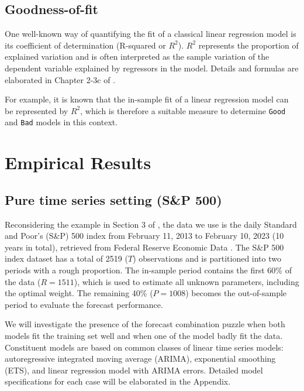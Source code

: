 \documentclass{monashthesis}
\begin{document}
\hypertarget{goodness-of-fit}{%
\section{Goodness-of-fit}\label{goodness-of-fit}}

One well-known way of quantifying the fit of a classical linear regression model is its coefficient of determination (R-squared or \(R^2\)). \(R^2\) represents the proportion of explained variation and is often interpreted as the sample variation of the dependent variable explained by regressors in the model. Details and formulas are elaborated in Chapter 2-3c of \textcite{W15}.

For example, it is known that the in-sample fit of a linear regression model can be represented by \(R^2\), which is therefore a suitable measure to determine \texttt{Good} and \texttt{Bad} models in this context.

\hypertarget{empirical-results}{%
\chapter{Empirical Results}\label{empirical-results}}

\hypertarget{sp500}{%
\section{Pure time series setting (S\&P 500)}\label{sp500}}

Reconsidering the example in Section 3 of \textcite{GA11}, the data we use is the daily Standard and Poor's (S\&P) 500 index from February 11, 2013 to February 10, 2023 (10 years in total), retrieved from Federal Reserve Economic Data \autocite{SP500}. The S\&P 500 index dataset has a total of 2519 (\(T\)) observations and is partitioned into two periods with a rough proportion. The in-sample period contains the first 60\% of the data (\(R = 1511\)), which is used to estimate all unknown parameters, including the optimal weight. The remaining 40\% (\(P = 1008\)) becomes the out-of-sample period to evaluate the forecast performance.

We will investigate the presence of the forecast combination puzzle when both models fit the training set well and when one of the model badly fit the data. Constituent models are based on common classes of linear time series models: autoregressive integrated moving average (ARIMA), exponential smoothing (ETS), and linear regression model with ARIMA errors. Detailed model specifications for each case will be elaborated in the Appendix.
\end{document}
